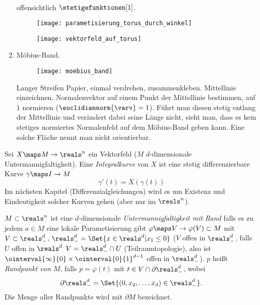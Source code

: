\begin{beispiele*}
\begin{enumerate}
\begin{gather*}
  \end{gather*}
  offensichtlich \( \stetigefunktionen[1] \).
  \begin{figure}[H]
    \centering
    \texttt{[image: parametisierung\_torus\_durch\_winkel]}
    \caption*{}
    \label{fig:parametisierung_torus_durch_winkel}
  \end{figure}
  \begin{figure}[H]
    \centering
    \texttt{[image: vektorfeld\_auf\_torus]}
    \label{fig:vektorfeld_auf_torus}
  \end{figure}
  \item Möbius-Band. 
  \begin{figure}[H]
    \centering
    \texttt{[image: moebius\_band]}
    \label{fig:moebius_band}
  \end{figure}
  Langer Streifen Papier, einmal verdrehen, zusammenkleben. Mittellinie einzeichnen. Normalenvektor auf einem Punkt der Mittellinie bestimmen, auf \( 1 \) normieren (\( \euclidiannorm{\varv}=1 \)). Führt man diesen stetig entlang der Mittellinie und verändert dabei seine Länge nicht, sieht man, dass es kein stetiges normiertes Normalenfeld auf dem Möbius-Band geben kann. Eine solche Fläche nennt man nicht orientierbar. 
  \end{enumerate}
\end{beispiele*}
\begin{definition}
  Sei \( X\maps M\to \reals^n  \) ein Vektorfeld (\( M \) \( d \)-dimensionale Untermannigfaltigkeit). Eine \emph{Integralkurve} von \( X \) ist eine stetig differenzierbare Kurve \( \gamma\maps I\to M \) \sd
  \begin{equation*}
    \gamma'(t)=X(\gamma(t))
  \end{equation*}
  Im nächsten Kapitel (Differenzialgleichungen) wird es um Existenz und Eindeutigkeit solcher Kurven gehen (aber nur im \( \reals^n \)).
\end{definition}
\begin{definition}
  \( M\subset \reals^n \) ist eine \( d \)-dimensionale \emph{Untermannigfaltigkeit mit Rand} falls es zu jedem \( a\in M \) eine lokale Parametisierung gibt \( \varphi\maps V\to \varphi(V)\subset M \) mit \( V\subset \reals^d_{-} \), \( \reals^d_{-}=\Set{x\in \reals^d|x_1\leq 0} \) (\( V \) offen in \( \reals^d_{-} \), falls \texists  \( U \) offen in \( \reals^d \) \sd \( V=\reals^d_{-}\cap U \) (Teilraumtopologie), also \zb ist \( \ointerval{\infty}{0}\times \ointerval{0}{1}^{d-1} \) offen in \( \reals^{d}_{-} \)). \( p \) heißt \emph{Randpunkt von \( M \)}, falls \( p=\varphi(t) \) mit \( t\in V\cap \partial \reals^d_{-} \), wobei
  \begin{equation*}
    \partial \reals^d_{-}=\Set{(0,x_2,\dotsc,x_{d})\in \reals^d_{-}}.
  \end{equation*}
  Die Menge aller Randpunkte wird mit \( \partial M \) bezeichnet.
\end{definition}
